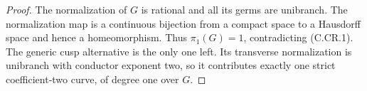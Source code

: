 \begin{proof}
The normalization of $G$ is rational and all its
germs are unibranch. The normalization map is a
continuous bijection from a compact space to a
Hausdorff space and hence a homeomorphism.
Thus $\pi_1(G)=1$, contradicting (C.CR.1).
The generic cusp alternative is the only one left.
Its transverse normalization is unibranch with
conductor exponent two, so it contributes exactly
one strict coefficient-two curve, of degree one
over $G$.
\end{proof}



